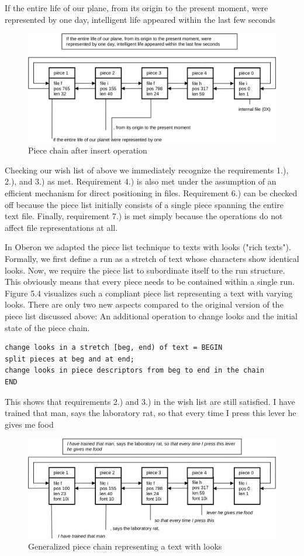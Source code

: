 If the entire life of our plane, from its origin to the present moment, were
represented by one day, intelligent life appeared within the last few seconds
\begin{figure}
  \label{fig:chain-after-insert}
  \centering
  \includegraphics[width=\textwidth]{i/f}
  \caption{Piece chain after insert operation}
\end{figure}

Checking our wish list of above we immediately recognize the requirements 1.), 2.), and 3.) as met.
Requirement 4.) is also met under the assumption of an efficient mechanism for direct positioning in
files. Requirement 6.) can be checked off because the piece list initially consists of a single piece
spanning the entire text file. Finally, requirement 7.) is met simply because the operations do not
affect file representations at all.

In Oberon we adapted the piece list technique to texts with looks ("rich texts"). Formally, we first
define a run as a stretch of text whose characters show identical looks. Now, we require the piece
list to subordinate itself to the run structure. This obviously means that every piece needs to be
contained within a single run. Figure 5.4 visualizes such a compliant piece list representing a text
with varying looks. There are only two new aspects compared to the original version of the piece list
discussed above: An additional operation to change looks and the initial state of the piece chain.
\begin{verbatim}
change looks in a stretch [beg, end) of text = BEGIN
split pieces at beg and at end;
change looks in piece descriptors from beg to end in the chain
END
\end{verbatim}
This shows that requirements 2.) and 3.) in the wish list are still satisfied.
I have trained that man, says the laboratory rat, so that every time I press this lever
he gives me food
\begin{figure}
  \label{fig:chain-generalized}
  \centering
  \includegraphics[width=\textwidth]{i/g}
  \caption{Generalized piece chain representing a text with looks}
\end{figure}

